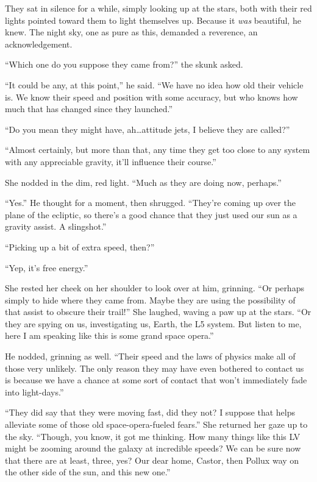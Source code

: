 They sat in silence for a while, simply looking up at the stars, both with their red lights pointed toward them to light themselves up. Because it \emph{was} beautiful, he knew. The night sky, one as pure as this, demanded a reverence, an acknowledgement.

``Which one do you suppose they came from?'' the skunk asked.

``It could be any, at this point,'' he said. ``We have no idea how old their vehicle is. We know their speed and position with some accuracy, but who knows how much that has changed since they launched.''

``Do you mean they might have, ah\ldots attitude jets, I believe they are called?''

``Almost certainly, but more than that, any time they get too close to any system with any appreciable gravity, it'll influence their course.''

She nodded in the dim, red light. ``Much as they are doing now, perhaps.''

``Yes.'' He thought for a moment, then shrugged. ``They're coming up over the plane of the ecliptic, so there's a good chance that they just used our sun as a gravity assist. A slingshot.''

``Picking up a bit of extra speed, then?''

``Yep, it's free energy.''

She rested her cheek on her shoulder to look over at him, grinning. ``Or perhaps simply to hide where they came from. Maybe they are using the possibility of that assist to obscure their trail!'' She laughed, waving a paw up at the stars. ``Or they are spying on us, investigating us, Earth, the L5 system. But listen to me, here I am speaking like this is some grand space opera.''

He nodded, grinning as well. ``Their speed and the laws of physics make all of those very unlikely. The only reason they may have even bothered to contact us is because we have a chance at some sort of contact that won't immediately fade into light-days.''

``They did say that they were moving fast, did they not? I suppose that helps alleviate some of those old space-opera-fueled fears.'' She returned her gaze up to the sky. ``Though, you know, it got me thinking. How many things like this LV might be zooming around the galaxy at incredible speeds? We can be sure now that there are at least, three, yes? Our dear home, Castor, then Pollux way on the other side of the sun, and this new one.''

